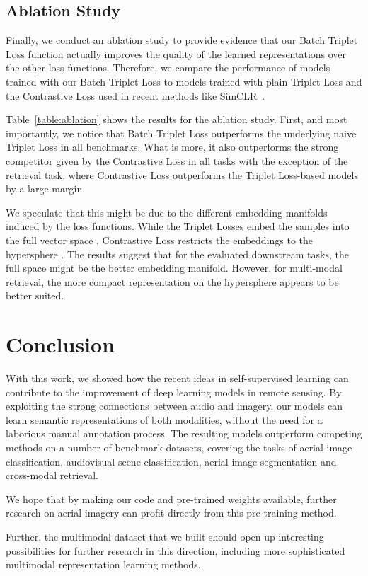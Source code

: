 \documentclass[journal]{IEEEtran}
\begin{document}
\subsection{Ablation Study}\label{sect:ablation}
Finally, we conduct an ablation study to provide evidence
that our Batch Triplet Loss function actually improves
the quality of the learned representations over the other loss functions.
Therefore, we compare the performance of models trained with our Batch Triplet Loss
to models trained with plain Triplet Loss
and the Contrastive Loss used in recent methods like SimCLR~\cite{simclr}.
 
Table~\ref{table:ablation} shows the results for the ablation study.
First, and most importantly, we notice that Batch Triplet Loss outperforms the
underlying naive Triplet Loss in all benchmarks.
What is more, it also outperforms the strong competitor given by the Contrastive Loss
in all tasks with the exception of the retrieval task,
where Contrastive Loss outperforms the Triplet Loss-based models by a large margin.

We speculate that this might be due to the different
embedding manifolds induced by the loss functions.
While the Triplet Losses embed the samples into the full vector space ,
Contrastive Loss restricts the embeddings to the hypersphere .
The results suggest that for the evaluated downstream tasks,
the full space might be the better embedding manifold.
However, for multi-modal retrieval,
the more compact representation on the hypersphere
appears to be better suited.

\section{Conclusion}
With this work, we showed how the recent ideas in
self-supervised learning can contribute to the improvement of
deep learning models in remote sensing.
By exploiting the strong connections between audio and imagery,
our models can learn semantic representations of both modalities,
without the need for a laborious manual annotation process.
The resulting models outperform competing methods
on a number of benchmark datasets,
covering the tasks of
aerial image classification, audiovisual scene classification,
aerial image segmentation and cross-modal retrieval.

We hope that by making our code and pre-trained weights available,
further research on aerial imagery can profit directly from this
pre-training method.

Further, the multimodal dataset that we built should open up interesting
possibilities for further research in this direction,
including more sophisticated multimodal representation learning methods.
\end{document}
